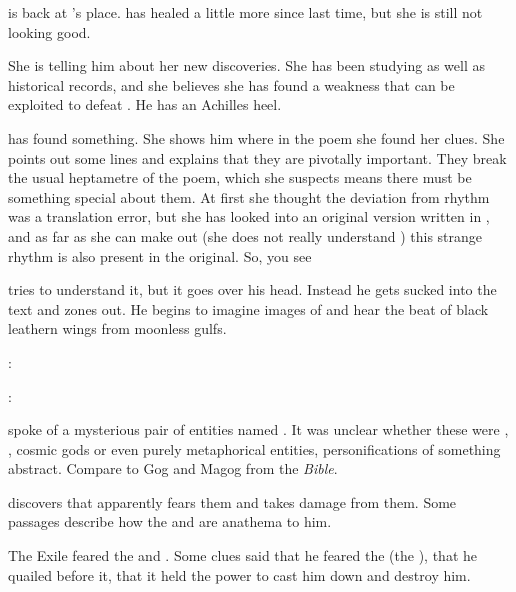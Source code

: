 
\Teshrial is back at \Urizeth's place.
\Urizeth has healed a little more since last time, but she is still not looking good.

She is telling him about her new discoveries.  
She has been studying \WanderersInDarknessEmph as well as historical records, and she believes she has found a weakness that can be exploited to defeat \Ishnaruchaefir. 
He has an Achilles heel. 

\Urizeth has found something.
She shows him where in the poem she found her clues.
She points out some lines and explains that they are pivotally important. 
They break the usual heptametre of the poem, which she suspects means there must be something special about them.
At first she thought the deviation from rhythm was a translation error, but she has looked into an original version written in \TrueDraconic, and as far as she can make out (she does not really understand \TrueDraconic) this strange rhythm is also present in the original.
So, you see\prikker

\Teshrial tries to understand it, but it goes over his head.
Instead he gets sucked into the text and zones out. 
He begins to imagine images of \dragons and hear the beat of black leathern wings from moonless gulfs.

\Urizeth:

\Teshrial:




\begin{comment}
  \section{\Zaz and \Urzaz}
\end{comment}
\WanderersInDarknessEmph spoke of a mysterious pair of entities named . 
It was unclear whether these were \dragons, \xss, cosmic gods or even purely metaphorical entities, personifications of something abstract.
Compare to Gog and Magog from the \emph{Bible}.

\Urizeth discovers that \Ishnaruchaefir apparently fears them and takes damage from them.  
Some \WanderersInDarknessEmph passages describe how the \Zaz and \Urzaz are anathema to him.

The Exile feared the  and .
Some clues said that he feared the \malgryph (the ), that he quailed before it, that it held the power to cast him down and destroy him.

